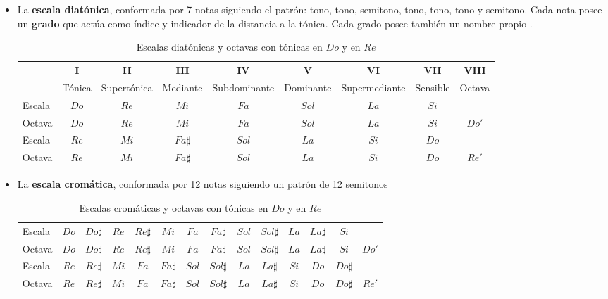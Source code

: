 \begin{itemize}
    \item La \textbf{escala diatónica}, conformada por 7 notas siguiendo el patrón: tono, tono, semitono, tono, tono, tono y semitono. Cada nota posee un \textbf{grado} que actúa como índice y indicador de la distancia a la tónica. Cada grado posee también un nombre propio .

    \begin{table}[H]
        \centering
        \scriptsize
        \caption{Escalas diatónicas y octavas con tónicas en $Do$ y en $Re$}\label{tab:escala_diatonica}
        \begin{tabular}{l c c c c c c c c}
            \hline
            & \textbf{I} & \textbf{II} & \textbf{III} & \textbf{IV} & \textbf{V} & \textbf{VI} & \textbf{VII} & \textbf{VIII} \\
            & {\tiny Tónica} & {\tiny Supertónica} & {\tiny Mediante} & {\tiny Subdominante} & {\tiny Dominante} & {\tiny Supermediante} & {\tiny Sensible} & {\tiny Octava}  \\
            \hline
            Escala & $Do$ & $Re$ & $Mi$ & $Fa$ & $Sol$ & $La$ & $Si$ &  \\
            Octava & $Do$ & $Re$ & $Mi$ & $Fa$ & $Sol$ & $La$ & $Si$ & $Do'$  \\
            \hline
            Escala & $Re$ & $Mi$ & $Fa\sharp$ & $Sol$ & $La$ & $Si$ & $Do$ &  \\
            Octava & $Re$ & $Mi$ & $Fa\sharp$ & $Sol$ & $La$ & $Si$ & $Do$ & $Re'$  \\
            \hline
        \end{tabular}
    \end{table}
    
    \item La \textbf{\gls{escala cromática}}, conformada por 12 notas siguiendo un patrón de 12 semitonos 
    
    \begin{table}[H]
        \centering
        \caption{Escalas cromáticas y octavas con tónicas en $Do$ y en $Re$}\label{tab:escala_cromatica}
        \scriptsize
        \begin{tabular}{l c c c c c c c c c c c c c}
            \hline
            Escala & $Do$ & $Do\sharp$ & $Re$ & $Re\sharp$ & $Mi$ & $Fa$ & $Fa\sharp$ & $Sol$ & $Sol\sharp$ & $La$ & $La\sharp$ & $Si$ \\
            Octava & $Do$ & $Do\sharp$ & $Re$ & $Re\sharp$ & $Mi$ & $Fa$ &
            $Fa\sharp$ & $Sol$ & $Sol\sharp$ & $La$ & $La\sharp$ & $Si$ & $Do'$ \\
            \hline
            Escala & $Re$ & $Re\sharp$ & $Mi$ & $Fa$ & $Fa\sharp$ & $Sol$ & $Sol\sharp$ & $La$ & $La\sharp$ & $Si$ & $Do$ & $Do\sharp$ \\
            Octava & $Re$ & $Re\sharp$ & $Mi$ & $Fa$ & $Fa\sharp$ & $Sol$ & $Sol\sharp$ & $La$ & $La\sharp$ & $Si$ & $Do$ & $Do\sharp$ & $Re'$ \\
            \hline
        \end{tabular}
    \end{table}
\end{itemize}

